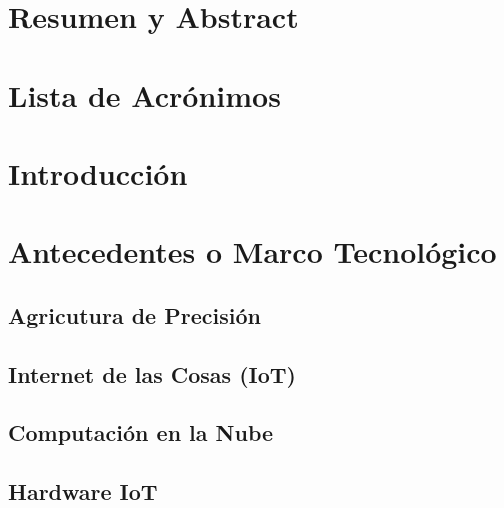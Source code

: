 \documentclass[12pt]{article}
\begin{document}

\thispagestyle{empty}
\newpage

\section*{Resumen y Abstract}

\newpage

\tableofcontents{}
\newpage

\section*{Lista de Acrónimos}

\newpage

\section{Introducción}

\newpage

\section{Antecedentes o Marco Tecnológico}


\subsection{Agricutura de Precisión}


\subsection{Internet de las Cosas (IoT)}


\subsection{Computación en la Nube}


\subsection{Hardware IoT}
\end{document}
